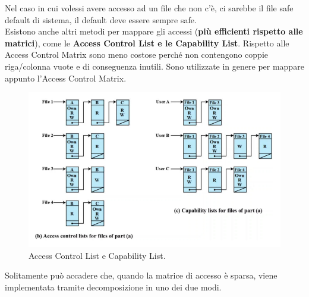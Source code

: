 \noindent Nel caso in cui volessi avere accesso ad un file che non c’è, ci sarebbe il file safe default di sistema, il default deve essere sempre safe. \\
Esistono anche altri metodi per mappare gli accessi (\textbf{più efficienti rispetto alle matrici}), come le \textbf{Access Control List e le Capability List}. Rispetto alle Access Control Matrix sono meno costose perché non contengono coppie riga/colonna vuote e di conseguenza inutili. Sono utilizzate in genere per mappare appunto l’Access Control Matrix.

\begin{figure}[H]
    \centering
    \includegraphics[width=12cm, keepaspectratio]{capitoli/policy/imgs/matrix_access_control2.png}
    \caption{ Access Control List e Capability List.}
\end{figure}
\noindent Solitamente può accadere che, quando la matrice di accesso è sparsa, viene implementata tramite decomposizione in uno dei due modi.\\
